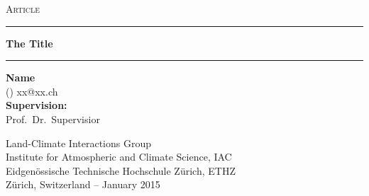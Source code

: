 \thispagestyle{empty}


\begin{center}
	\begin{LARGE}
\textsc{Article}\\ %
\noindent\rule[1ex]{\textwidth}{0.8pt}  %
\newline
\textbf{{
The Title
}}  \\[1ex]
\noindent\rule[1ex]{\textwidth}{0.8pt} %
	\end{LARGE}
\end{center}

%

\vfill
\begin{center}
	\large
\textbf{Name}\\(\Letter{}) xx@xx.ch \\[0.5cm]
\textbf{Supervision:}\\
Prof.\ Dr.\ Supervisior\\
\end{center}



\begin{center}
\large
Land-Climate Interactions Group \\ 
Institute for Atmospheric and Climate Science,  IAC\\
Eidgenössische Technische Hochschule Zürich, ETHZ\\[10pt]
Zürich, Switzerland -- January 2015 \\%
\end{center}

\vspace{20pt}


